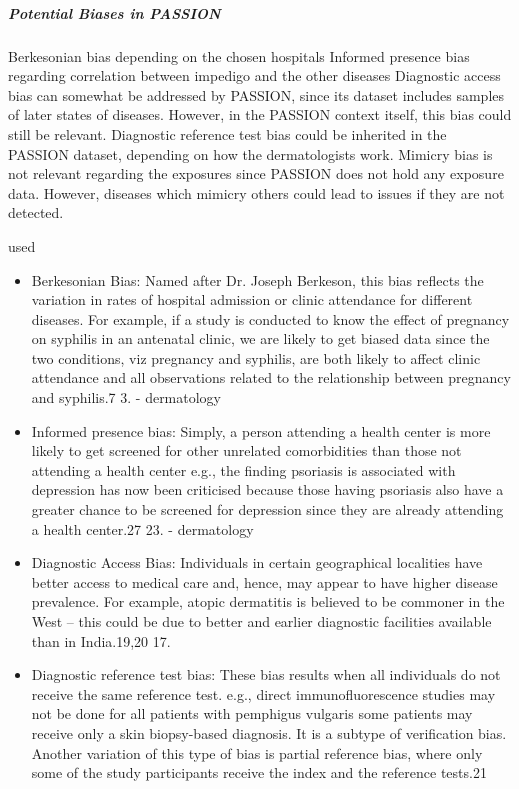 \documentclass[12pt, a4paper, oneside]{book}   	%
\newif\ifrawcitationactive
\newcommand{\rawcitationstart}{\color{purple}\rawcitationactivetrue}
\newcommand{\rawcitationusedstart}{\color{violet}}
\begin{document}
			\subparagraph{Potential Biases in PASSION}
			Berkesonian bias depending on the chosen hospitals
			Informed presence bias regarding correlation between impedigo and the other diseases
			Diagnostic access bias can somewhat be addressed by PASSION, since its dataset includes samples of later states of diseases. However, in the PASSION context itself, this bias could still be relevant.
			Diagnostic reference test bias could be inherited in the PASSION dataset, depending on how the dermatologists work.
			Mimicry bias is not relevant regarding the exposures since PASSION does not hold any exposure data. However, diseases which mimicry others could lead to issues if they are not detected.
			
			
			
			\rawcitationstart
			used
			\begin{itemize}		
				\rawcitationusedstart
				\item Berkesonian Bias: Named after Dr. Joseph Berkeson, this bias reflects the variation in rates of hospital admission or clinic attendance for different diseases. For example, if a study is conducted to know the effect of pregnancy on syphilis in an antenatal clinic, we are likely to get biased data since the two conditions, viz pregnancy and syphilis, are both likely to affect clinic attendance and all observations related to the relationship between pregnancy and syphilis.7 3. \autocite{Chakraborty_2024} - dermatology
				
				\item  Informed presence bias: Simply, a person attending a health center is more likely to get screened for other unrelated comorbidities than those not attending a health center e.g., the finding psoriasis is associated with depression has now been criticised because those having psoriasis also have a greater chance to be screened for depression since they are already attending a health center.27 23. \autocite{Chakraborty_2024} - dermatology	
				
				\item  Diagnostic Access Bias: Individuals in certain geographical localities have better access to medical care and, hence, may appear to have higher disease prevalence. For example, atopic dermatitis is believed to be commoner in the West – this could be due to better and earlier diagnostic facilities available than in India.19,20 17.\autocite{Chakraborty_2024}
				
				\item  Diagnostic reference test bias: These bias results when all individuals do not receive the same reference test. e.g., direct immunofluorescence studies may not be done for all patients with pemphigus vulgaris some patients may receive only a skin biopsy-based diagnosis. It is a subtype of verification bias. Another variation of this type of bias is partial reference bias, where only some of the study participants receive the index and the reference tests.21\autocite{Chakraborty_2024}
				

\end{itemize}
\end{document}
